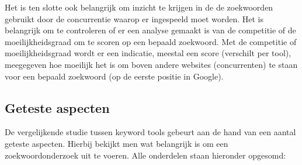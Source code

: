 Het is ten slotte ook belangrijk om inzicht te krijgen in de de zoekwoorden gebruikt door de concurrentie waarop er ingespeeld moet worden. Het is belangrijk om te controleren of er een analyse gemaakt is van de competitie of de moeilijkheidsgraad om te scoren op een bepaald zoekwoord. Met de competitie of moeilijkheidsgraad wordt er een indicatie, meestal een score (verschilt per tool), meegegeven hoe moeilijk het is om boven andere websites (concurrenten) te staan voor een bepaald zoekwoord (op de eerste positie in Google). 

\subsection{Geteste aspecten}
\label{ch: Geteste aspecten}

De vergelijkende studie tussen keyword tools gebeurt aan de hand van een aantal geteste aspecten. Hierbij bekijkt men wat belangrijk is om een zoekwoordonderzoek uit te voeren. Alle onderdelen staan hieronder opgesomd: 

